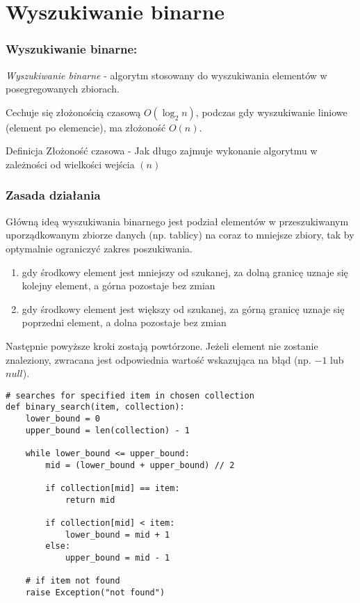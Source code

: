 \documentclass{beamer}
\begin{document}
    \section{Wyszukiwanie binarne}
    \begin{frame}
        \frametitle{Wyszukiwanie binarne:}
        \emph{Wyszukiwanie binarne} - algorytm stosowany do wyszukiwania
        elementów w posegregowanych zbiorach.
        
        Cechuje się złożonością czasową $O \left(\log_2 n \right)$, podczas gdy wyszukiwanie liniowe (element po elemencie), ma złożoność $O \left( n \right)$.

        \begin{block}{Definicja}
            Złożoność czasowa - Jak długo zajmuje wykonanie algorytmu w zależności od wielkości wejścia $\left(n\right)$
        \end{block}
    \end{frame}
    \begin{frame}
        \frametitle{Zasada działania}
        Główną ideą wyszukiwania binarnego jest podział elementów w przeszukiwanym uporządkowanym zbiorze danych
        (np. tablicy) na coraz to mniejsze zbiory, tak by optymalnie ograniczyć zakres poszukiwania.

        \begin{enumerate}
            \item gdy środkowy element jest mniejszy od szukanej, za dolną granicę uznaje się kolejny element, a górna pozostaje bez zmian
            \item gdy środkowy element jest większy od szukanej, za górną granicę uznaje się poprzedni element,
            a dolna pozostaje bez zmian
        \end{enumerate}

        Następnie powyższe kroki zostają powtórzone. Jeżeli element nie zostanie znaleziony,
        zwracana jest odpowiednia wartość wskazująca na błąd (np. $-1$ lub $null$).
    \end{frame}
    \begin{verbatim}
# searches for specified item in chosen collection
def binary_search(item, collection):
    lower_bound = 0
    upper_bound = len(collection) - 1

    while lower_bound <= upper_bound:
        mid = (lower_bound + upper_bound) // 2

        if collection[mid] == item:
            return mid

        if collection[mid] < item:
            lower_bound = mid + 1
        else:
            upper_bound = mid - 1

    # if item not found
    raise Exception("not found")
    \end{verbatim}
\end{document}
